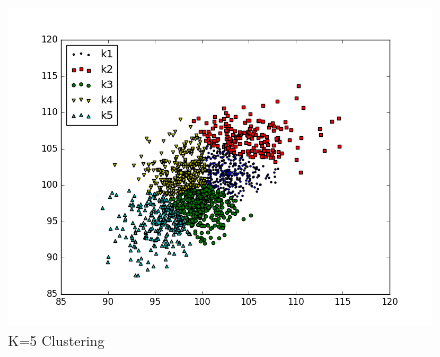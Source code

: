 \documentclass[12pt]{article}
\numberwithin{equation}{subsection}
\begin{document}
\begin{figure}[H]
	\centering
    \includegraphics[width=0.9\linewidth]{KCluster1}
    \caption{K=5 Clustering}
\end{figure}
\end{document}
